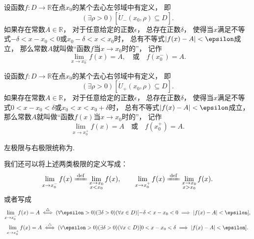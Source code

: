 \begin{definition}\label{definition:极限.函数极限的定义2}
设函数\(f\colon D\to\mathbb{R}\)在点\(x_0\)的某个去心左邻域中有定义，
即\[
	(\exists\rho>0)
	[\mathring{U}_-(x_0,\rho) \subseteq D].
\]
如果存在常数\(A\in\mathbb{R}\)，
对于任意给定的正数\(\epsilon\)，
总存在正数\(\delta\)，
使得当\(x\)满足不等式\(-\delta < x - x_0 < 0\)或\(x_0 - \delta < x < x_0\)时，
总有不等式\(\abs{f(x) - A} < \epsilon\)成立，
那么常数\(A\)就叫做“函数\(f\)当\(x \to x_0\)时的”，
记作\[
	\lim_{x \to x_0^-} f(x) = A,
	\quad\text{或}\quad
	f(x_0^-) = A.
\]
\end{definition}

\begin{definition}\label{definition:极限.函数极限的定义3}
设函数\(f\colon D\to\mathbb{R}\)在点\(x_0\)的某个去心右邻域中有定义，
即\[
	(\exists\rho>0)
	[\mathring{U}_+(x_0,\rho) \subseteq D].
\]
如果存在常数\(A\in\mathbb{R}\)，
对于任意给定的正数\(\epsilon\)，
总存在正数\(\delta\)，
使得当\(x\)满足不等式\(0 < x - x_0 < \delta\)或\(x_0 < x < x_0 + \delta\)时，
总有不等式\(\abs{f(x) - A} < \epsilon\)成立，
那么常数\(A\)就叫做“函数\(f(x)\)当\(x \to x_0\)时的”，
记作\[
	\lim_{x \to x_0^+} f(x) = A
	\quad\text{或}\quad
	f(x_0^+) = A.
\]
\end{definition}

左极限与右极限统称为.

\begin{remark}
我们还可以将上述两类极限的定义写成：\begin{gather*}
	\lim_{x \to x_0^-} f(x)
	\defeq
	\lim_{\substack{x \to x_0 \\ x < x_0}} f(x), \qquad
	\lim_{x \to x_0^+} f(x)
	\defeq
	\lim_{\substack{x \to x_0 \\ x > x_0}} f(x).
\end{gather*}
或者写成\begin{gather*}
	\lim_{x \to x_0^-} f(x) = A
	\defiff
	(\forall \epsilon > 0)
	(\exists \delta > 0)
	(\forall x \in D)
	[-\delta < x - x_0 < 0 \implies \abs{f(x) - A} < \epsilon], \\
	\lim_{x \to x_0^+} f(x) = A
	\defiff
	(\forall \epsilon > 0)
	(\exists \delta > 0)
	(\forall x \in D)
	[0 < x - x_0 < \delta \implies \abs{f(x) - A} < \epsilon].
\end{gather*}
\end{remark}

